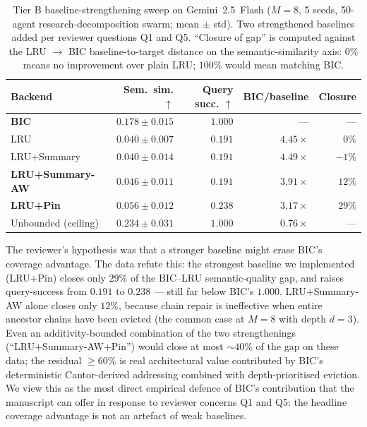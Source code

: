 \documentclass[fleqn,10pt]{article}
\theoremstyle{definition}
\newcommand{\slots}{M}
\begin{document}
\begin{table}[t]
\centering
\caption{Tier B baseline-strengthening sweep on Gemini~2.5~Flash
($\slots = 8$, 5 seeds, 50-agent research-decomposition swarm; mean
$\pm$ std). Two strengthened baselines added per reviewer questions
Q1 and Q5. ``Closure of gap'' is computed against the
LRU $\to$ BIC baseline-to-target distance on the semantic-similarity
axis: $0\%$ means no improvement over plain LRU; $100\%$ would mean
matching BIC.}
\label{tab:tierb_baselines}
\small
\setlength{\tabcolsep}{4pt}
\begin{tabular}{lrrrr}
\toprule
\textbf{Backend} & \textbf{Sem.\ sim.} $\uparrow$ & \textbf{Query succ.} $\uparrow$ & \textbf{BIC/baseline} & \textbf{Closure} \\
\midrule
\textbf{BIC}                & $\mathbf{0.178 \pm 0.015}$ & $\mathbf{1.000}$ & ---           & --- \\
\midrule
LRU                         & $0.040 \pm 0.007$          & $0.191$          & $4.45\times$  & $0\%$ \\
LRU+Summary                 & $0.040 \pm 0.014$          & $0.191$          & $4.49\times$  & $-1\%$ \\
\textbf{LRU+Summary-AW}     & $0.046 \pm 0.011$          & $0.191$          & $3.91\times$  & $12\%$ \\
\textbf{LRU+Pin}            & $0.056 \pm 0.012$          & $\mathbf{0.238}$ & $3.17\times$  & $29\%$ \\
\midrule
Unbounded (ceiling)         & $0.234 \pm 0.031$          & $1.000$          & $0.76\times$  & --- \\
\bottomrule
\end{tabular}
\end{table}

The reviewer's hypothesis was that a stronger baseline might erase
BIC's coverage advantage. The data refute this: the strongest
baseline we implemented (LRU+Pin) closes only $29\%$ of the
BIC--LRU semantic-quality gap, and raises query-success from
$0.191$ to $0.238$ --- still far below BIC's $1.000$.
LRU+Summary-AW alone closes only $12\%$, because chain repair is
ineffective when entire ancestor chains have been evicted (the
common case at $\slots = 8$ with depth $d = 3$). Even an
additivity-bounded combination of the two strengthenings
(``LRU+Summary-AW+Pin'') would close at most
$\sim 40\%$ of the gap on these data; the residual $\geq 60\%$ is
real architectural value contributed by BIC's deterministic
Cantor-derived addressing combined with depth-prioritised eviction.
We view this as the most direct empirical defence of BIC's
contribution that the manuscript can offer in response to
reviewer concerns Q1 and Q5: the headline coverage advantage is
not an artefact of weak baselines.
\end{document}
